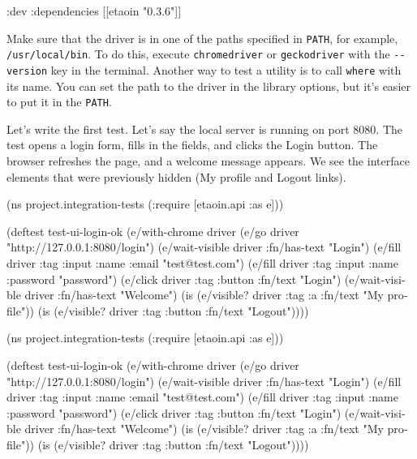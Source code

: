 \begin{english}
  \begin{clojure}
:dev {:dependencies [[etaoin "0.3.6"]]}
  \end{clojure}
\end{english}

Make sure that the driver is in one of the paths specified in \verb|PATH|, for example, \verb|/usr/local/bin|. To do this, execute \texttt{chrome\-driver} or \verb|geckodriver| with the \verb|--version| key in the terminal. Another way to test a utility is to call \verb|where| with its name. You can set the path to the driver in the library options, but it's easier to put it in the \verb|PATH|.


Let's write the first test. Let's say the local server is running on port 8080. The test opens a login form, fills in the fields, and clicks the Login button. The browser refreshes the page, and a welcome message appears. We see the interface elements that were previously hidden (My profile and Logout links).

\ifx\DEVICETYPE\MOBILE

\begin{english}
  \begin{clojure}
(ns project.integration-tests
  (:require [etaoin.api :as e]))

(deftest test-ui-login-ok
  (e/with-chrome {} driver
    (e/go driver
      "http://127.0.0.1:8080/login")
    (e/wait-visible driver
      {:fn/has-text "Login"})
    (e/fill driver
      {:tag :input :name :email}
      "test@test.com")
    (e/fill driver
      {:tag :input :name :password}
      "password")
    (e/click driver
      {:tag :button :fn/text "Login"})
    (e/wait-visible driver
      {:fn/has-text "Welcome"})
    (is (e/visible? driver
          {:tag :a
           :fn/text "My profile"}))
    (is (e/visible? driver
          {:tag :button
           :fn/text "Logout"}))))
  \end{clojure}
\end{english}

\else

\begin{english}
  \begin{clojure}
(ns project.integration-tests
  (:require [etaoin.api :as e]))

(deftest test-ui-login-ok
  (e/with-chrome {} driver
    (e/go driver "http://127.0.0.1:8080/login")
    (e/wait-visible driver {:fn/has-text "Login"})
    (e/fill driver {:tag :input :name :email} "test@test.com")
    (e/fill driver {:tag :input :name :password} "password")
    (e/click driver {:tag :button :fn/text "Login"})
    (e/wait-visible driver {:fn/has-text "Welcome"})
    (is (e/visible? driver {:tag :a :fn/text "My profile"}))
    (is (e/visible? driver {:tag :button :fn/text "Logout"}))))
  \end{clojure}
\end{english}

